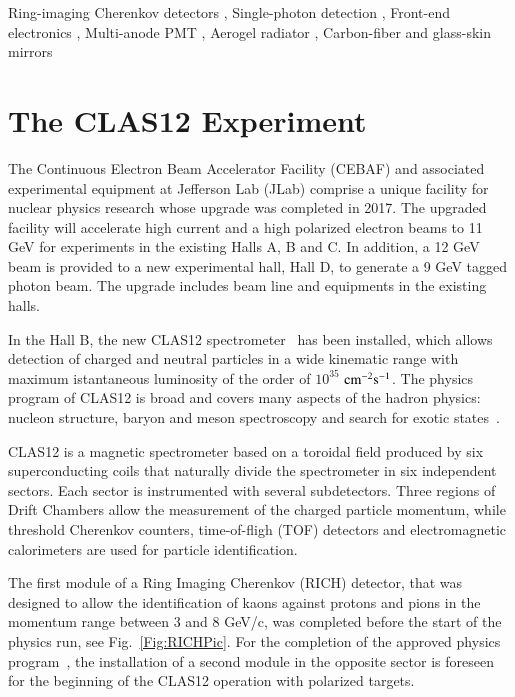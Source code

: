 \documentclass[final,5p,times,twocolumn]{elsarticle}
\begin{document}
\begin{frontmatter}
\begin{keyword}
Ring-imaging Cherenkov detectors
\sep
Single-photon detection
\sep
Front-end electronics
\sep
Multi-anode PMT
\sep 
Aerogel radiator
\sep 
Carbon-fiber and glass-skin mirrors
\end{keyword}

\end{frontmatter}

\section{The CLAS12 Experiment}

The Continuous Electron Beam Accelerator Facility (CEBAF) and associated experimental equipment at Jefferson Lab (JLab) 
comprise a unique facility for nuclear physics research whose upgrade was completed in 2017. The upgraded facility will 
accelerate high current and a high polarized electron beams to 11 GeV for experiments in the existing Halls A, B and C.  
In addition, a 12 GeV beam is provided to a new experimental hall, Hall D, to generate a 9 GeV tagged photon beam. The 
upgrade includes beam line and equipments in the existing halls.

In the Hall B, the new CLAS12 spectrometer~\cite{CLAS12:tdr} has been installed, which allows detection of charged and 
neutral particles in a wide kinematic range with maximum istantaneous luminosity of the order of $10^{35}$ $\rm cm^{-2} s^{-1}$.
The physics program of CLAS12 is broad and covers many aspects of the hadron physics: nucleon structure, baryon and meson 
spectroscopy and search for exotic states~\cite{CLAS12:physics}.

CLAS12 is a magnetic spectrometer based on a toroidal field produced by six superconducting coils that naturally divide 
the spectrometer in six independent sectors. Each sector is instrumented with several subdetectors. Three regions of 
Drift Chambers allow the measurement of the charged particle momentum, while threshold Cherenkov counters, time-of-fligh 
(TOF) detectors and electromagnetic calorimeters are used for particle identification.

The first module of a Ring Imaging Cherenkov (RICH) detector, that was designed to allow the identification of kaons against 
protons and pions in the momentum range between 3 and 8 GeV/c, was completed before the start of the physics run, see 
Fig.~\ref{Fig:RICHPic}. For the completion of the approved physics program~\cite{PSHP10},  
the installation of a second module in the opposite sector is foreseen for the beginning of the CLAS12 operation with 
polarized targets.
\end{document}
